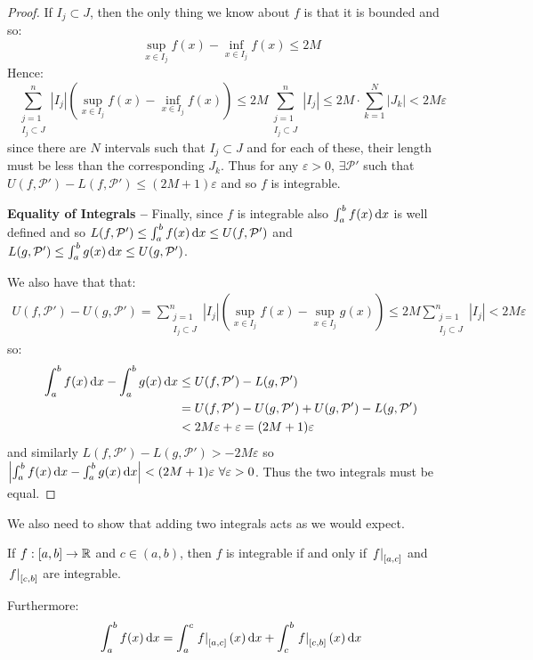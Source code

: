 \documentclass[../main.tex]{subfiles}
\begin{document}
\begin{proof}
  If $I_j \subset J$, then the only thing we know about $f$ is that it is bounded and so:
  \[
    \sup_{x \in I_j} f(x) - \inf_{x \in I_j} f(x) \leq 2M
  \]
  Hence:
  \[
    \sum_{\substack{j = 1\\I_j \subset J}}^{n} |I_j| \left(\sup_{x \in I_j} f(x) - \inf_{x \in I_j} f(x)\right) \leq 2 M \sum_{\substack{j = 1\\I_j \subset J}}^{n} |I_j| \leq 2M \cdot \sum_{k = 1}^{N} |J_k| < 2M \varepsilon
  \]
  since there are $N$ intervals such that $I_j \subset J$ and for each of these, their length must be less than the corresponding $J_k$.
  Thus for any $\varepsilon > 0$, $\exists \mathcal{P}'$ such that $U(f, \mathcal{P}') - L(f, \mathcal{P}') \leq (2M + 1)\varepsilon$ and so $f$ is integrable.

  \textbf{Equality of Integrals --} Finally, since $f$ is integrable also $\int_{a}^{b} f(x) \d{x}$ is well defined and so $L(f, \mathcal{P}') \leq \int_{a}^{b} f(x) \d{x} \leq U(f, \mathcal{P}')$ and $L(g, \mathcal{P}') \leq \int_{a}^{b} g(x) \d{x} \leq U(g, \mathcal{P}')$.

  We also have that that:
  \begin{align*}
    U(f, \mathcal{P}') - U(g, \mathcal{P}') = \sum_{\substack{j = 1 \\ I_j \subset J}}^{n} |I_j| \left(\sup_{x \in I_j} f(x) - \sup_{x \in I_j} g(x)\right) \leq 2M\sum_{\substack{j = 1 \\ I_j \subset J}}^{n} |I_j| < 2M\varepsilon
  \end{align*}
  so:
  \begin{align*}
    \int_{a}^{b} f(x) \d{x} - \int_{a}^{b} g(x) \d{x} &\leq U(f, \mathcal{P}') - L(g, \mathcal{P}') \\
                                                      &= U(f, \mathcal{P}') - U(g, \mathcal{P}') + U(g, \mathcal{P}') - L(g, \mathcal{P}') \\
                                                      &< 2M\varepsilon + \varepsilon = (2M + 1)\varepsilon
  \end{align*}
  and similarly $L(f, \mathcal{P}') - L(g, \mathcal{P}') > -2M\varepsilon$ so $\abs{\int_{a}^{b} f(x) \d{x} - \int_{a}^{b} g(x) \d{x}} < (2M + 1)\varepsilon\ \forall \varepsilon > 0$.
  Thus the two integrals must be equal.
\end{proof}
We also need to show that adding two integrals acts as we would expect.
\begin{proposition}
  If $f: [a, b] \to \mathbb{R}$ and $c \in (a, b)$, then $f$ is integrable if and only if $\left. f \right|_{[a, c]}$ and $\left. f \right|_{[c, b]}$ are integrable. \label{integralAdditivity}

  Furthermore:
  \[
    \int_{a}^{b} f(x) \d{x} = \int_{a}^{c} \at{f}{[a, c]}(x) \d{x} + \int_{c}^{b} \at{f}{[c, b]}(x) \d{x}
  \]
\end{proposition}
\end{document}
